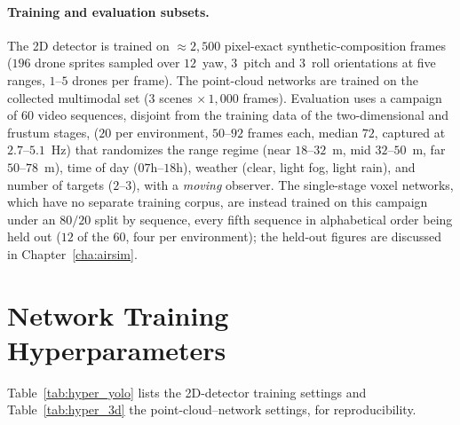 \paragraph*{Training and evaluation subsets.} The 2D detector is trained on
$\approx2{,}500$ pixel-exact synthetic-composition frames ($196$ drone sprites
sampled over $12$~yaw, $3$~pitch and $3$~roll orientations at five ranges,
$1$--$5$ drones per frame). The point-cloud networks are trained on the collected
multimodal set ($3$ scenes $\times\,1{,}000$ frames). Evaluation uses a
campaign of $60$ video sequences, disjoint from the training data of the
two-dimensional and frustum stages, ($20$ per environment, $50$--$92$ frames each,
median $72$, captured at $2.7$--$5.1$~Hz) that randomizes the range regime (near $18$--$32$~m, mid
$32$--$50$~m, far $50$--$78$~m), time of day ($07$h--$18$h), weather (clear, light
fog, light rain), and number of targets ($2$--$3$), with a \emph{moving} observer.
The single-stage voxel networks, which have no separate training corpus, are
instead trained on this campaign under an $80/20$ split by sequence, every fifth
sequence in alphabetical order being held out ($12$ of the $60$, four per
environment); the held-out figures are discussed in Chapter~\ref{cha:airsim}.

\section{Network Training Hyperparameters}
\label{ap:train_hyper}

Table~\ref{tab:hyper_yolo} lists the 2D-detector training settings and
Table~\ref{tab:hyper_3d} the point-cloud--network settings, for reproducibility.

\begin{table}[H]
  \centering
  \footnotesize
  \caption{YOLOv11-small training (Ultralytics defaults unless noted): SGD with
  Nesterov momentum, weight decay, and a cosine learning-rate schedule.}
  \label{tab:hyper_yolo}
\end{table}

